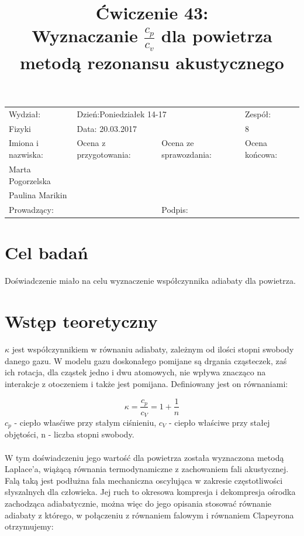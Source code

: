 \documentclass[a4paper,10pt]{article}
\def\arraystretch{1.2}
\begin{document}
\begin{table}
  \centering
  \def\arraystretch{1.5}
    \begin{tabular}{|l|l|l|l|} \hline
    Wydział:           & \multicolumn{2}{l|}{Dzień:Poniedziałek 14-17}    &Zespół:  \\
    Fizyki             &    \multicolumn{2}{l|}{Data: 20.03.2017}         &8             \\\hline
    Imiona i nazwiska: &Ocena z przygotowania:  &Ocena ze sprawozdania:   &Ocena końcowa: \\
    Marta Pogorzelska  &                        &                         &                \\
    Paulina Marikin    &                        &                         &\\\hline
    \multicolumn{2}{|l|}{Prowadzący:                 } &\multicolumn{2}{l|}{Podpis:             }  \\\hline
  \end{tabular}
\end{table}

\title{Ćwiczenie 43:\\Wyznaczanie $\frac{c_p}{c_v}$ dla powietrza metodą rezonansu akustycznego}
\date{}
\maketitle

\section{Cel badań}
Doświadczenie miało na celu wyznaczenie współczynnika adiabaty dla powietrza.

\section{Wstęp teoretyczny}
$\kappa$ jest współczynnikiem w równaniu adiabaty, zależnym od ilości stopni swobody danego gazu. W modelu gazu doskonałego pomijane są drgania cząsteczek, zaś ich rotacja,
dla cząstek jedno i dwu atomowych, nie wpływa znacząco na interakcje z otoczeniem i także jest pomijana. Definiowany jest on równaniami:

\begin{equation}
  \kappa = \frac{c_p}{c_V} = 1+\frac{1}{n}
\end{equation}
$c_p$ - ciepło własćiwe przy stałym ciśnieniu, $c_V$ - ciepło właściwe przy stałej objętości, n - liczba stopni swobody.
\\\\W tym doświadczeniu jego wartość dla powietrza została wyznaczona metodą Laplace'a, wiążącą równania termodynamiczne z zachowaniem fali akustycznej. Falą taką jest podłużna
fala mechaniczna oscylująca w zakresie częstotliwości słyszalnych dla człowieka. Jej ruch to okresowa kompresja i dekompresja ośrodka zachodząca adiabatycznie, można więc do jego opisania stosować
równanie adiabaty z którego, w połączeniu z równaniem falowym i równaniem Clapeyrona otrzymujemy:
\end{document}
